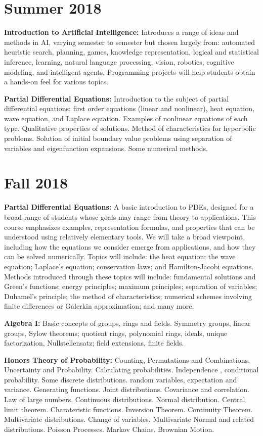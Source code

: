 \documentclass[11pt]{article}
\begin{document}
\section*{Summer 2018}

{\bf Introduction to Artificial Intelligence:} Introduces a range of ideas and
methods in AI, varying semester to semester but chosen largely from: automated
heuristic search, planning, games, knowledge representation, logical and
statistical inference, learning, natural language processing, vision, robotics,
cognitive modeling, and intelligent agents. Programming projects will help
students obtain a hands-on feel for various topics.

{\bf Partial Differential Equations:} Introduction to the subject of partial
differential equations: first order equations (linear and nonlinear), heat
equation, wave equation, and Laplace equation. Examples of nonlinear equations
of each type. Qualitative properties of solutions. Method of characteristics for
hyperbolic problems. Solution of initial boundary value problems using
separation of variables and eigenfunction expansions. Some numerical methods.

\section*{Fall 2018}

{\bf Partial Differential Equations:} A basic introduction to PDEs, designed for
a broad range of students whose goals may range from theory to applications.
This course emphasizes examples, representation formulas, and properties that
can be understood using relatively elementary tools. We will take a broad
viewpoint, including how the equations we consider emerge from applications, and
how they can be solved numerically. Topics will include: the heat equation; the
wave equation; Laplace's equation; conservation laws; and Hamilton-Jacobi
equations. Methods introduced through these topics will include: fundamental
solutions and Green's functions; energy principles; maximum principles;
separation of variables; Duhamel's principle; the method of characteristics;
numerical schemes involving finite differences or Galerkin approximation; and
many more.

{\bf Algebra I:} Basic concepts of groups, rings and fields. Symmetry groups,
linear groups, Sylow theorems; quotient rings, polynomial rings, ideals, unique
factorization, Nullstellensatz; field extensions, finite fields.

{\bf Honors Theory of Probability:} Counting, Permutations and Combinations,
Uncertainty and Probability. Calculating probabilities. Independence
, conditional probability. Some discrete distributions. random variables,
expectation and variance. Generating functions.  Joint distributions.
Covariance and correlation. Law of large numbers. Continuous distributions.
Normal distribution. Central limit theorem.  Charateristic functions. Inversion
Theorem. Continuity Theorem.  Multivariate distributions. Change of variables.
Multivariate Normal and related distributions. Poisson Processes. Markov Chains.
Brownian Motion.
\end{document}
